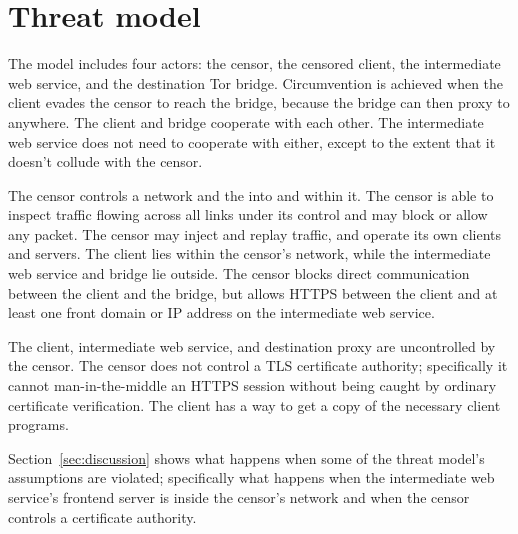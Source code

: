 \documentclass[conference]{IEEEtran}
\newcommand{\meek}{\texttt{meek}\xspace}
\begin{document}


\section{Threat model}

The model includes four actors:
the censor,
the censored client,
the intermediate web service,
and the destination Tor bridge.
Circumvention is achieved when the client evades the censor to reach
the bridge,
because the bridge can then proxy to anywhere.
The client and bridge cooperate with each other.
The intermediate web service does not need to cooperate with either,
except to the extent that it doesn't collude with the censor.

The censor controls a network and the into and within it.
The censor is able to inspect traffic flowing across all links under its control
and may block or allow any packet.
The censor may inject and replay traffic, and
operate its own clients and servers.
The client lies within the censor's network,
while the intermediate web service and bridge lie outside.
The censor blocks direct communication between the client and the bridge,
but allows HTTPS between the client and at least one front domain or IP address
on the intermediate web service.


The client,
intermediate web service,
and destination proxy
are uncontrolled by the censor.
The censor does not control a TLS certificate authority;
specifically it cannot man-in-the-middle an HTTPS session
without being caught by ordinary certificate verification.
The client has a way to get a copy of the necessary client programs.

Section~\ref{sec:discussion} shows what happens when some
of the threat model's assumptions are violated;
specifically what happens
when the intermediate web service's frontend server is inside the censor's network
and when the censor controls a certificate authority.
\end{document}
